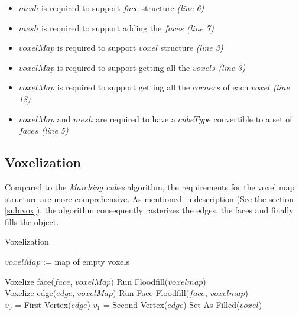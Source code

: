 \begin{itemize}
\item $mesh$ is required to support $face$ structure \emph{(line 6)}
\item $mesh$ is required to support adding the $faces$ \emph{(line 7)}
\item $voxelMap$ is required to support $voxel$ structure \emph{(line 3)}
\item $voxelMap$ is required to support getting all the $voxels$ \emph{(line 3)}
\item $voxelMap$ is required to support getting all the $corners$ of each $voxel$ \emph{(line 18)}
\item $voxelMap$ and $mesh$ are required to have a $cubeType$ convertible to a set of $faces$ \emph{(line 5)}
\end{itemize}

\subsection{Voxelization}

Compared to the \emph{Marching cubes} algorithm, the requirements for the voxel map structure
are more comprehensive. As mentioned in description (See the section \ref{sub:vox}),
the algorithm consequently rasterizes
the edges, the faces and finally fills the object.

\begin{algorithm}[H]
\caption{Voxelization}
\label{alg:vox}
\begin{algorithmic}[1]
			\State $voxelMap$ := map of empty voxels

			\State Voxelize face($face$, $voxelMap$)
		\EndParallelFor
		\State Run Floodfill($voxel map$)
		\State {}
	\EndFunction
	\\
			\State Voxelize edge($edge$, $voxelMap$)
		\EndFor
		\State Run Face Floodfill($face$, $voxel map$)
	\EndFunction
	\\
		\State $v_{0}$ = First Vertex($edge$)
		\State $v_{1}$ = Second Vertex($edge$)
			\State Set As Filled($voxel$)
		\EndFor
	\EndFunction
\end{algorithmic}
\end{algorithm}